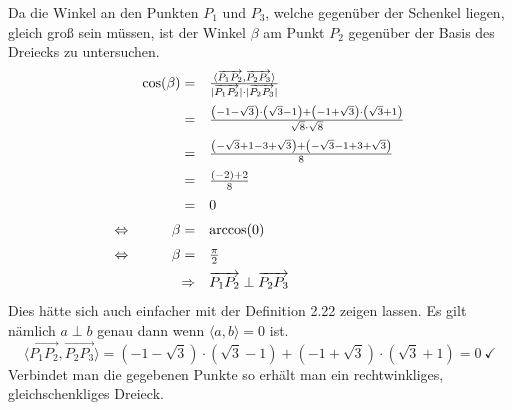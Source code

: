 Da die Winkel an den Punkten $\displaystyle P_{1}$ und $\displaystyle P_{3}$, welche gegenüber der Schenkel liegen, gleich groß sein müssen, ist der Winkel $\displaystyle \beta $ am Punkt $\displaystyle P_{2}$ gegenüber der Basis des Dreiecks zu untersuchen.
\begin{equation*}
  \begin{array}{ r r l }
    & \cos( \beta ) = & \frac{\langle \overrightarrow{P_{1} P_{2}} ,\overrightarrow{P_{2} P_{3}} \rangle }{|\overrightarrow{P_{1} P_{2}} |\cdot |\overrightarrow{P_{2} P_{3}} |}\vspace{2mm}\\
    & = & \frac{\left( -1-\sqrt{3}\right) \cdot \left(\sqrt{3} -1\right) +\left( -1+\sqrt{3}\right) \cdot \left(\sqrt{3} +1\right)}{\sqrt{8} \cdot \sqrt{8}}\vspace{2mm}\\
    & = & \frac{\left( -\sqrt{3} +1-3+\sqrt{3}\right) +\left( -\sqrt{3} -1+3+\sqrt{3}\right)}{8}\vspace{2mm}\\
    & = & \frac{( -2) +2}{8}\vspace{2mm}\\
    & = & 0\vspace{2mm}\\
    \Leftrightarrow  & \beta = & \arccos( 0)\vspace{2mm}\\
    \Leftrightarrow  & \beta = & \frac{\pi }{2}\vspace{2mm}\\
    & \Rightarrow  & \overrightarrow{P_{1} P_{2}} \perp \overrightarrow{P_{2} P_{3}}
  \end{array}
\end{equation*}
Dies hätte sich auch einfacher mit der Definition 2.22 zeigen lassen. Es gilt nämlich $\displaystyle a\perp b$ genau dann wenn $\displaystyle \langle a,b\rangle =0$ ist.
\begin{equation*}
  \langle \overrightarrow{P_{1} P_{2}} ,\overrightarrow{P_{2} P_{3}} \rangle =\left( -1-\sqrt{3}\right) \cdot \left(\sqrt{3} -1\right) +\left( -1+\sqrt{3}\right) \cdot \left(\sqrt{3} +1\right) =0\ \checkmark 
\end{equation*}
Verbindet man die gegebenen Punkte so erhält man ein rechtwinkliges, gleichschenkliges Dreieck.